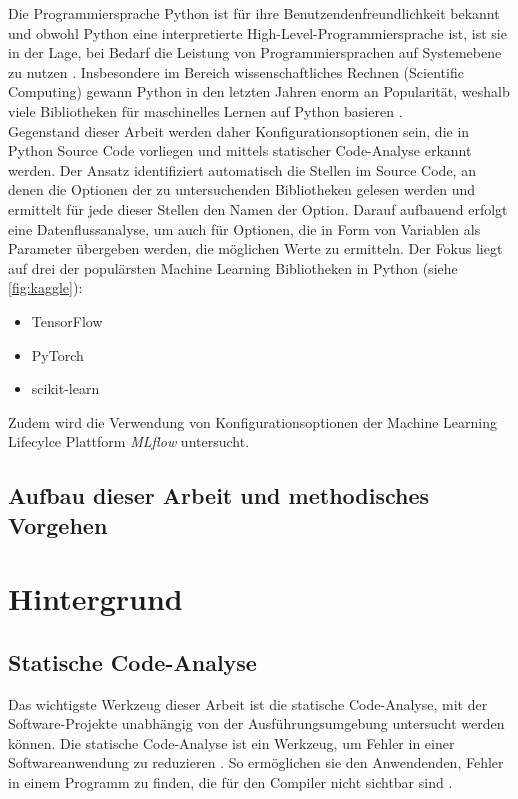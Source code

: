 \documentclass[german,bachelor]{swsLeipzig}
\begin{document}
Die Programmiersprache Python ist für ihre Benutzendenfreundlichkeit bekannt und obwohl Python eine interpretierte High-Level-Programmiersprache ist,
ist sie in der Lage, bei Bedarf die Leistung von Programmiersprachen auf Systemebene zu nutzen \cite[]{2020}.
Insbesondere im Bereich wissenschaftliches Rechnen (Scientific Computing) gewann Python in den letzten Jahren enorm an Popularität,
weshalb viele Bibliotheken für maschinelles Lernen auf Python basieren \cite[]{2020}.\\

Gegenstand dieser Arbeit werden daher Konfigurationsoptionen sein, die in Python Source Code vorliegen und mittels statischer Code-Analyse erkannt werden.
Der Ansatz identifiziert automatisch die Stellen im Source Code, an denen die Optionen der zu untersuchenden Bibliotheken gelesen werden
und ermittelt für jede dieser Stellen den Namen der Option.
Darauf aufbauend erfolgt eine Datenflussanalyse, um auch für Optionen, die in Form von Variablen als Parameter übergeben werden,
die möglichen Werte zu ermitteln.
Der Fokus liegt auf drei der populärsten Machine Learning Bibliotheken in Python (siehe \autoref{fig:kaggle}):
\begin{itemize}
 \item TensorFlow
 \item PyTorch
 \item scikit-learn
\end{itemize}
Zudem wird die Verwendung von Konfigurationsoptionen der Machine Learning Lifecylce Plattform \textit{MLflow} untersucht. \\


\section{Aufbau dieser Arbeit und methodisches Vorgehen}

\chapter{Hintergrund}\label{Hintergrund}

\section{Statische Code-Analyse}
Das wichtigste Werkzeug dieser Arbeit ist die statische Code-Analyse,
mit der Software-Projekte unabhängig von der Ausführungsumgebung untersucht werden können.
Die statische Code-Analyse ist ein Werkzeug, um Fehler in einer Softwareanwendung zu reduzieren \cite[]{bardas2010static}.
So ermöglichen sie den Anwendenden, Fehler in einem Programm zu finden, die für den Compiler nicht sichtbar sind \cite[]{bardas2010static}.\\
\end{document}
